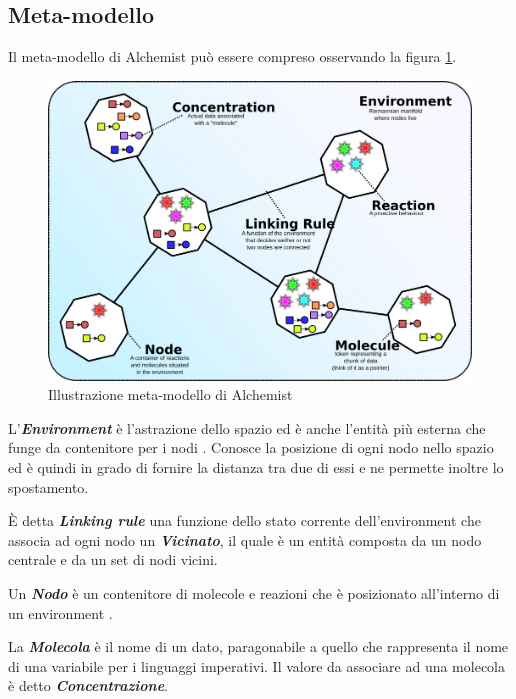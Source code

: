 \subsection{Meta-modello}
Il meta-modello di Alchemist può essere compreso osservando la figura \ref{fig:alchemistModel}.
\begin{figure}[h] %
\begin{center} %
\includegraphics[width=12.5cm]{images/AlchemistModel.png} %
\caption[Illustrazione meta-modello di Alchemist]{Illustrazione meta-modello di Alchemist} \label{fig:alchemistModel}
\end{center}
\end{figure}

L'\textbf{\textit{Environment}} è l'astrazione dello spazio ed è anche l'entità più esterna che funge da contenitore per i nodi \cite{Alchemist}. Conosce la posizione di ogni nodo nello spazio ed è quindi in grado di fornire la distanza tra due di essi e ne permette inoltre lo spostamento.

\`E detta \textbf{\textit{Linking rule}} una funzione dello stato corrente dell'environment che associa ad ogni nodo un \textbf{\textit{Vicinato}}, il quale è un entità composta da un nodo centrale e da un set di nodi vicini.

Un \textbf{\textit{Nodo}} è un contenitore di molecole e reazioni che è posizionato all'interno di un environment \cite{Alchemist}.

La \textbf{\textit{Molecola}} è il nome di un dato, paragonabile a quello che rappresenta il nome di una variabile per i linguaggi imperativi.
Il valore da associare ad una molecola è detto \textbf{\textit{Concentrazione}}.

